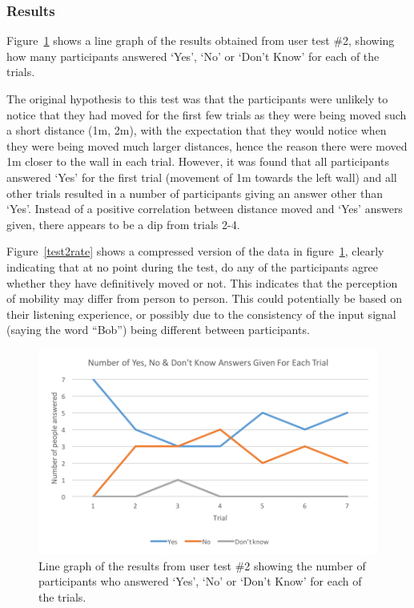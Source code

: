 \documentclass[../../main.tex]{subfiles}
\begin{document}
			\subsubsection{Results}

				Figure~\ref{test2results} shows a line graph of the results obtained from user test \#2, showing how many participants answered `Yes', `No' or `Don't Know' for each of the trials.

				The original hypothesis to this test was that the participants were unlikely to notice that they had moved for the first few trials as they were being moved such a short distance (1m, 2m), with the expectation that they would notice when they were being moved much larger distances, hence the reason there were moved 1m closer to the wall in each trial. However, it was found that all participants answered `Yes' for the first trial (movement of 1m towards the left wall) and all other trials resulted in a number of participants giving an answer other than `Yes'. Instead of a positive correlation between distance moved and `Yes' answers given, there appears to be a dip from trials 2-4.

				Figure~\ref{test2rate} shows a compressed version of the data in figure~\ref{test2results}, clearly indicating that at no point during the test, do any of the participants agree whether they have definitively moved or not. This indicates that the perception of mobility may differ from person to person. This could potentially be based on their listening experience, or possibly due to the consistency of the input signal (saying the word ``Bob'') being different between participants.

				\begin{figure}[H]
					\centerline{\includegraphics[scale = 1]{Sections/userTesting/images/test2/Q2_edit.png}}
					\caption{Line graph of the results from user test \#2 showing the number of participants who answered `Yes', `No' or `Don't Know' for each of the trials.}
					\label{test2results}
				\end{figure}
\end{document}
